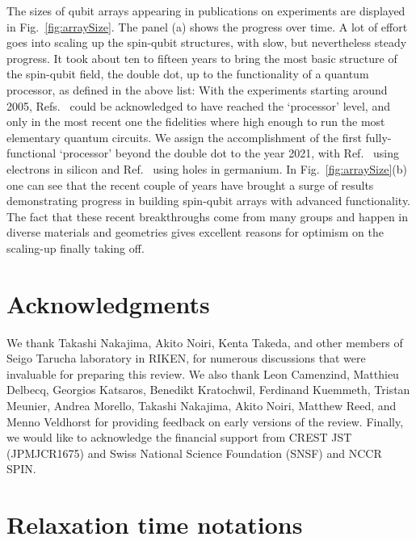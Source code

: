 \documentclass[aps, prx, showpacs, twocolumn, superscriptaddress, notitlepage, longbibliography, floatfix, nofootinbib]{revtex4-2}
\begin{document}
The sizes of qubit arrays appearing in publications on experiments are displayed in Fig.~\ref{fig:arraySize}. The panel (a) shows the progress over time. A lot of effort goes into scaling up the spin-qubit structures, with slow, but nevertheless steady progress.
It took about ten to fifteen years to bring the most basic structure of the spin-qubit field, the double dot, up to the functionality of a quantum processor, as defined in the above list: With the experiments starting \cite{petta_coherent_2005} around 2005, Refs.~\cite{veldhorst_two-qubit_2015,zajac_resonantly_2017,watson_programmable_2018} could be acknowledged to have reached the `processor' level, and only in the most recent one the fidelities where high enough to run the most elementary quantum circuits. We assign the accomplishment of the first fully-functional `processor' beyond the double dot to the year 2021, with Ref.~\cite{takeda_quantum_2021} using electrons in silicon and Ref.~\cite{hendrickx_four-qubit_2021} using holes in germanium. 
In Fig.~\ref{fig:arraySize}(b) one can see that the recent couple of years have brought a surge of results demonstrating progress in building spin-qubit arrays with advanced functionality. The fact that these recent breakthroughs come from many groups and happen in diverse materials and geometries gives excellent reasons for optimism on the scaling-up finally taking off.



\section{Acknowledgments}

We thank Takashi Nakajima, Akito Noiri, Kenta Takeda, and other members of Seigo Tarucha laboratory in RIKEN, for numerous discussions that were invaluable for preparing this review. We also thank Leon Camenzind, Matthieu Delbecq, Georgios Katsaros, Benedikt Kratochwil, Ferdinand Kuemmeth, Tristan Meunier, Andrea Morello, Takashi Nakajima,  Akito Noiri, Matthew Reed, and Menno Veldhorst for providing feedback on early versions of the review. Finally, we would like to acknowledge the financial support from CREST JST (JPMJCR1675) and Swiss National Science Foundation (SNSF) and NCCR SPIN.







\appendix

\section{Relaxation time notations}
\end{document}
